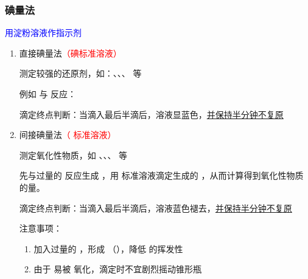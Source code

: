         \subsubsection{碘量法}\label{subsubsec:碘量法氧化还原滴定}
        
            \textcolor{blue}{用淀粉溶液作指示剂}

            \begin{enumerate}
                \item 直接碘量法\textcolor{red}{（碘标准溶液）}
                
                测定较强的还原剂，如：、、、 等

                例如  与  反应： 

                滴定终点判断：当滴入最后半滴后，溶液显蓝色，\uline{并保持半分钟不复原}

                \item 间接碘量法\textcolor{red}{（ 标准溶液）}
                
                测定氧化性物质，如 、、、 等

                先与过量的  反应生成 ，用  标准溶液滴定生成的 ，从而计算得到氧化性物质的量。

                滴定终点判断：当滴入最后半滴后，溶液蓝色褪去，\uline{并保持半分钟不复原}

                注意事项：
                \begin{enumerate}
                    \item 加入过量的 ，形成 （），降低  的挥发性
                    \item 由于  易被  氧化，滴定时不宜剧烈摇动锥形瓶
                \end{enumerate}

            \end{enumerate}
